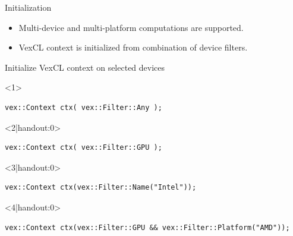 \documentclass[@BEAMER_OPTIONS@]{beamer}
\begin{document}
\begin{frame}[fragile]{Initialization}
    \begin{itemize}
        \item Multi-device and multi-platform computations are supported.
        \item VexCL context is initialized from combination of device filters.
    \end{itemize}
    \vspace{-0.5\baselineskip}
    \begin{overlayarea}{\textwidth}{0.4\textheight}
    \begin{exampleblock}{Initialize VexCL context on selected devices}
        \begin{onlyenv}<1>
        \begin{lstlisting}
vex::Context ctx( vex::Filter::Any );
        \end{lstlisting}
        \end{onlyenv}
        \begin{onlyenv}<2|handout:0>
        \begin{lstlisting}
vex::Context ctx( vex::Filter::GPU );
        \end{lstlisting}
        \end{onlyenv}
        \begin{onlyenv}<3|handout:0>
        \begin{lstlisting}
vex::Context ctx(vex::Filter::Name("Intel"));
        \end{lstlisting}
        \end{onlyenv}
        \begin{onlyenv}<4|handout:0>
        \begin{lstlisting}
vex::Context ctx(vex::Filter::GPU && vex::Filter::Platform("AMD"));
        \end{lstlisting}
        \end{onlyenv}
    \end{exampleblock}
    \end{overlayarea}
    \begin{figure}
\end{figure}
\end{frame}
\end{document}
